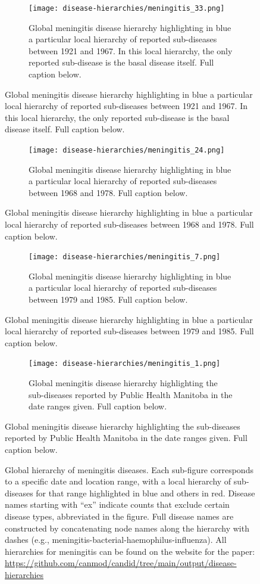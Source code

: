 \documentclass[12pt]{article}
\begin{document}
\begin{figure}
\begin{subfigure}{1\textwidth}
  \texttt{[image: disease-hierarchies/meningitis\_33.png]}
  \caption{Global meningitis disease hierarchy highlighting in blue a particular local hierarchy of reported sub-diseases between 1921 and 1967. In this local hierarchy, the only reported sub-disease is the basal disease itself. Full caption below.}\label{fig:appendix-meningitis-early}
\end{subfigure}
\end{figure}
\begin{figure}\ContinuedFloat
\begin{subfigure}{1\textwidth}
  \texttt{[image: disease-hierarchies/meningitis\_24.png]}
  \caption{Global meningitis disease hierarchy highlighting in blue a particular local hierarchy of reported sub-diseases between 1968 and 1978. Full caption below.}\label{fig:appendix-meningitis-70s}
\end{subfigure}
\end{figure}
\begin{figure}\ContinuedFloat
\begin{subfigure}{1\textwidth}
  \texttt{[image: disease-hierarchies/meningitis\_7.png]}
  \caption{Global meningitis disease hierarchy highlighting in blue a particular local hierarchy of reported sub-diseases between 1979 and 1985. Full caption below.}\label{fig:appendix-meningitis-80s}
\end{subfigure}
\end{figure}
\begin{figure}\ContinuedFloat
\begin{subfigure}{1\textwidth}
  \texttt{[image: disease-hierarchies/meningitis\_1.png]}
  \caption{Global meningitis disease hierarchy highlighting the sub-diseases reported by Public Health Manitoba in the date ranges given. Full caption below.}\label{fig:appendix-meningitis-man}
\end{subfigure}
\end{figure}
\begin{figure}\ContinuedFloat
  \caption{Global hierarchy of meningitis diseases. Each sub-figure corresponds to a specific date and location range, with a local hierarchy of sub-diseases for that range highlighted in blue and others in red. Disease names starting with ``ex'' indicate counts that exclude certain disease types, abbreviated in the figure. Full disease names are constructed by concatenating node names along the hierarchy with dashes (e.g., meningitis-bacterial-haemophilus-influenza). All hierarchies for meningitis can be found on the website for the paper: \url{https://github.com/canmod/candid/tree/main/output/disease-hierarchies}}\label{fig:appendix-meningitis}
\end{figure}
\end{document}
